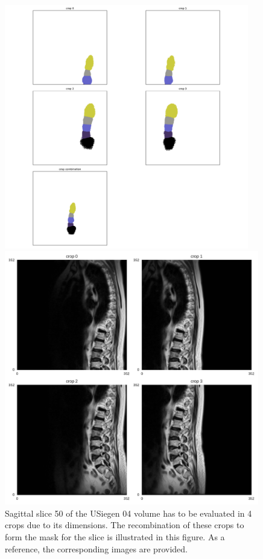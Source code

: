 \begin{figure}
\centering
\begin{minipage}{.99\textwidth}
    \includegraphics[width=0.95\textwidth]{images/USiegen_004_50_crops.pdf}
\end{minipage}
\begin{minipage}{.61\textwidth}
    \includegraphics[width=0.99\textwidth]{images/cropping_slice050.pdf}
\end{minipage}
    \caption{Sagittal slice 50 of the USiegen 04 volume has to be evaluated in 4 crops due to its dimensions. The recombination of these crops to form the mask for the slice is illustrated in this figure. As a reference, the corresponding images are provided.}
\end{figure}

